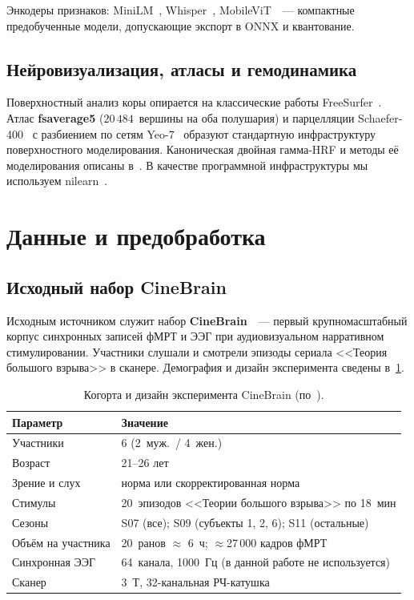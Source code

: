 \documentclass[11pt,a4paper]{article}
\begin{document}
Энкодеры признаков: MiniLM~\cite{Wang2020}, Whisper~\cite{Radford2023},
MobileViT~\cite{Mehta2022}~--- компактные предобученные модели,
допускающие экспорт в ONNX и квантование.

\subsection{Нейровизуализация, атласы и гемодинамика}
\label{sec:related-neuroimaging}

Поверхностный анализ коры опирается на классические работы
FreeSurfer~\cite{Dale1999,Fischl1999,Fischl2000,Fischl2002,Fischl2012}.
Атлас \textbf{fsaverage5} ($20\,484$~вершины на оба полушария) и
парцелляции Schaefer-400~\cite{Schaefer2018} с разбиением по сетям
Yeo-7~\cite{Yeo2011} образуют стандартную инфраструктуру
поверхностного моделирования. Каноническая двойная гамма-HRF и
методы её моделирования описаны в~\cite{Glover1999,Lindquist2019}.
В качестве программной инфраструктуры мы используем
nilearn~\cite{Abraham2014}.

\section{Данные и предобработка}
\label{sec:data}

\subsection{Исходный набор CineBrain}
\label{sec:cinebrain}

Исходным источником служит набор \textbf{CineBrain}~\cite{Gao2025cinebrain,Gao2025cinebrain}~---
первый крупномасштабный корпус синхронных записей фМРТ и ЭЭГ при
аудиовизуальном нарративном стимулировании. Участники слушали и
смотрели эпизоды сериала <<Теория большого взрыва>> в сканере.
Демография и дизайн эксперимента сведены в~\cref{tab:cohort}.

\begin{table}[H]
\centering
\caption{Когорта и дизайн эксперимента CineBrain (по~\cite{Gao2025cinebrain}).}
\label{tab:cohort}
\small
\begin{tabular}{ll}
\toprule
Параметр & Значение \\
\midrule
Участники & 6 (2~муж.\ / 4~жен.) \\
Возраст & 21--26 лет \\
Зрение и слух & норма или скорректированная норма \\
Стимулы & 20~эпизодов <<Теории большого взрыва>> по 18~мин \\
Сезоны & S07 (все); S09 (субъекты 1, 2, 6); S11 (остальные) \\
Объём на участника & 20~ранов $\approx$ 6~ч; $\approx$27\,000 кадров фМРТ \\
Синхронная ЭЭГ & 64~канала, 1000~Гц (в данной работе не используется) \\
Сканер & 3~Т, 32-канальная РЧ-катушка \\
\bottomrule
\end{tabular}
\end{table}
\end{document}
